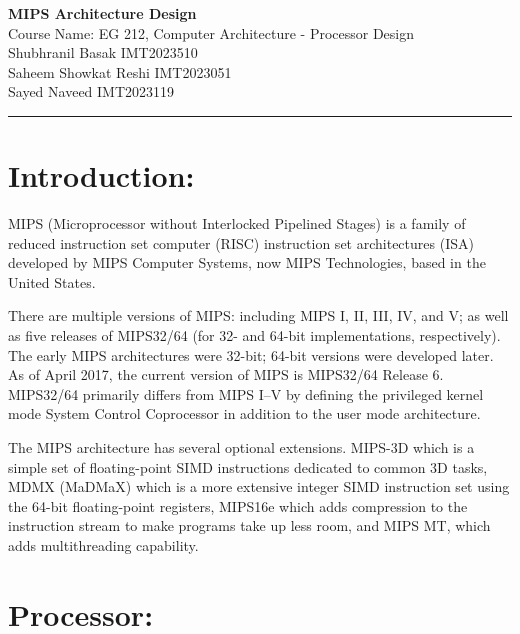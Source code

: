 \documentclass[a4paper,10pt]{article} %
\begin{document}
\begin{center}
    \huge{\textbf{MIPS Architecture Design}} \\[8pt]
    \large{Course Name: EG 212, Computer Architecture - Processor Design}\\[20pt]
    \large{Shubhranil Basak IMT2023510} \\[5pt]
    \large{Saheem Showkat Reshi IMT2023051} \\[5pt]
    \large{Sayed Naveed IMT2023119} \\[5pt]
\end{center}

\rule{\textwidth}{0.5pt}
\section*{Introduction:}

MIPS (Microprocessor without Interlocked Pipelined Stages) is a family of reduced instruction set computer (RISC) instruction set architectures (ISA) developed by MIPS Computer Systems, now MIPS Technologies, based in the United States.

There are multiple versions of MIPS: including MIPS I, II, III, IV, and V; as well as five releases of MIPS32/64 (for 32- and 64-bit implementations, respectively). The early MIPS architectures were 32-bit; 64-bit versions were developed later. As of April 2017, the current version of MIPS is MIPS32/64 Release 6. MIPS32/64 primarily differs from MIPS I–V by defining the privileged kernel mode System Control Coprocessor in addition to the user mode architecture.

The MIPS architecture has several optional extensions. MIPS-3D which is a simple set of floating-point SIMD instructions dedicated to common 3D tasks, MDMX (MaDMaX) which is a more extensive integer SIMD instruction set using the 64-bit floating-point registers, MIPS16e which adds compression to the instruction stream to make programs take up less room, and MIPS MT, which adds multithreading capability.\cite{WikipediaIAS}



\section*{Processor:}
\end{document}
